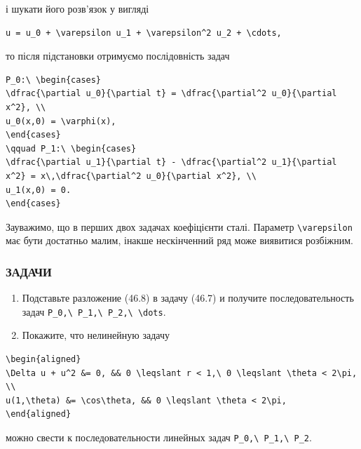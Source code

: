 \documentclass[
  ukrainian,
]{article}
\begin{document}
і шукати його розв'язок у вигляді

\begin{verbatim}
u = u_0 + \varepsilon u_1 + \varepsilon^2 u_2 + \cdots,
\end{verbatim}

то після підстановки отримуємо послідовність задач

\begin{verbatim}
P_0:\ \begin{cases}
\dfrac{\partial u_0}{\partial t} = \dfrac{\partial^2 u_0}{\partial x^2}, \\
u_0(x,0) = \varphi(x),
\end{cases}
\qquad P_1:\ \begin{cases}
\dfrac{\partial u_1}{\partial t} - \dfrac{\partial^2 u_1}{\partial x^2} = x\,\dfrac{\partial^2 u_0}{\partial x^2}, \\
u_1(x,0) = 0.
\end{cases}
\end{verbatim}

Зауважимо, що в перших двох задачах коефіцієнти сталі. Параметр
\texttt{\textbackslash{}varepsilon} має бути достатньо малим, інакше
нескінченний ряд може виявитися розбіжним.

\subsubsection{ЗАДАЧИ}\label{ux437ux430ux434ux430ux447ux438}

\begin{enumerate}
\def\labelenumi{\arabic{enumi}.}
\item
  Подставьте разложение (46.8) в задачу (46.7) и получите
  последовательность задач
  \texttt{P\_0,\textbackslash{}\ P\_1,\textbackslash{}\ P\_2,\textbackslash{}\ \textbackslash{}dots}.
\item
  Покажите, что нелинейную задачу
\end{enumerate}

\begin{verbatim}
\begin{aligned}
\Delta u + u^2 &= 0, && 0 \leqslant r < 1,\ 0 \leqslant \theta < 2\pi, \\
u(1,\theta) &= \cos\theta, && 0 \leqslant \theta < 2\pi,
\end{aligned}
\end{verbatim}

можно свести к последовательности линейных задач
\texttt{P\_0,\textbackslash{}\ P\_1,\textbackslash{}\ P\_2}.
\end{document}
